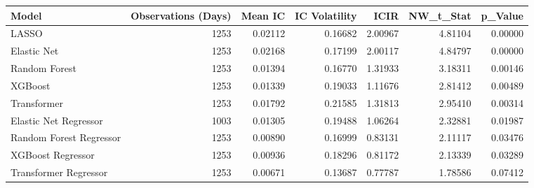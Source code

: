 \begin{tabular}{lrrrrrr}
\toprule
Model & Observations (Days) & Mean IC & IC Volatility & ICIR & NW_t_Stat & p_Value \\
\midrule
LASSO & 1253 & 0.02112 & 0.16682 & 2.00967 & 4.81104 & 0.00000 \\
Elastic Net & 1253 & 0.02168 & 0.17199 & 2.00117 & 4.84797 & 0.00000 \\
Random Forest & 1253 & 0.01394 & 0.16770 & 1.31933 & 3.18311 & 0.00146 \\
XGBoost & 1253 & 0.01339 & 0.19033 & 1.11676 & 2.81412 & 0.00489 \\
Transformer & 1253 & 0.01792 & 0.21585 & 1.31813 & 2.95410 & 0.00314 \\
Elastic Net Regressor & 1003 & 0.01305 & 0.19488 & 1.06264 & 2.32881 & 0.01987 \\
Random Forest Regressor & 1253 & 0.00890 & 0.16999 & 0.83131 & 2.11117 & 0.03476 \\
XGBoost Regressor & 1253 & 0.00936 & 0.18296 & 0.81172 & 2.13339 & 0.03289 \\
Transformer Regressor & 1253 & 0.00671 & 0.13687 & 0.77787 & 1.78586 & 0.07412 \\
\bottomrule
\end{tabular}
